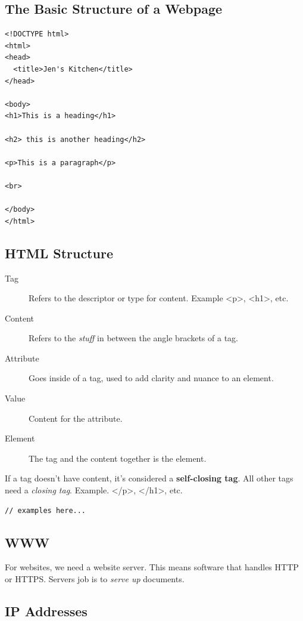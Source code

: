 \documentclass[11pt]{article}
\begin{document}
\subsection{The Basic Structure of a Webpage}
\label{sec:org91d9f79}

\begin{verbatim}
<!DOCTYPE html> 
<html> 
<head> 
  <title>Jen's Kitchen</title> 
</head> 

<body> 
<h1>This is a heading</h1>

<h2> this is another heading</h2>

<p>This is a paragraph</p>

<br> 

</body> 
</html> 
\end{verbatim}
\subsection{HTML Structure}
\label{sec:org4411280}

\begin{description}
\item[{Tag}] Refers to the descriptor or type for content. Example <p>, <h1>, etc.
\item[{Content}] Refers to the \emph{stuff} in between the angle brackets of a tag.
\item[{Attribute}] Goes inside of a tag, used to add clarity and nuance to an element.
\item[{Value}] Content for the attribute.
\item[{Element}] The tag and the content together is the element.
\end{description}

If a tag doesn't have content, it's considered a \textbf{self-closing tag}. All other tags need a \emph{closing tag}. Example. </p>, </h1>, etc.

\begin{verbatim}
// examples here...
\end{verbatim}
\subsection{WWW}
\label{sec:orga604708}

For websites, we need a website server. This means software that handles HTTP or HTTPS. Servers job is to \emph{serve up} documents.
\subsection{IP Addresses}
\label{sec:org5add84e}
\end{document}
